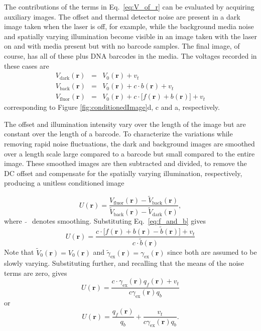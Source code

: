 The contributions of the terms in Eq.~\ref{eq:V_of_r} can be evaluated by acquiring auxiliary images. The offset and thermal detector noise are present in a dark image taken when the laser is off, for example, while the background media noise and spatially varying illumination become visible in an image taken with the laser on and with media present but with no barcode samples. The final image, of course, has all of these plus DNA barcodes in the media. The voltages recorded in these cases are
\begin{eqnarray}
V_{\text{dark}}(\mathbf{r})&=&V_0(\mathbf{r})+v_t\\
V_{\text{back}}(\mathbf{r})&=&V_0(\mathbf{r})+c \cdot  b(\mathbf{r})  +v_t\\
V_{\text{fluor}}(\mathbf{r})&=&V_0(\mathbf{r})+c \cdot \big[ f(\mathbf{r}) + b(\mathbf{r})\big]  +v_t
\end{eqnarray}
corresponding to Figure \ref{fig:conditionedImage}d, c and a, respectively. 

The offset and illumination intensity vary over the length of the image but are constant over the length of a barcode. To characterize the variations while removing rapid noise fluctuations, the dark and background images are smoothed over a length scale large compared to a barcode but small compared to the entire image. These smoothed images are then subtracted and divided, to remove the DC offset and compensate for the spatially varying illumination, respectively, producing a unitless conditioned image

\begin{equation}
U(\mathbf{r})= \frac{ V_{\text{fluor}}(\mathbf{r}) - \widetilde{V}_{\text{back}}(\mathbf{r})  }{ \widetilde{V}_{\text{back}}(\mathbf{r}) - \widetilde{V}_{\text{dark}}(\mathbf{r})} ,
\end{equation}
where~$\widetilde{~~}$~denotes smoothing. Substituting Eq.~\ref{eq:f_and_b} gives
\begin{equation}
U(\mathbf{r})= \frac{ c \cdot \big[ f(\mathbf{r})  +b(\mathbf{r}) -\widetilde{b}(\mathbf{r}) \big]+ v_t  }{   c \cdot \widetilde{b}(\mathbf{r}) }
\end{equation}
Note that $\widetilde{V}_0(\mathbf{r}) = V_0(\mathbf{r})$ and $\widetilde{\gamma}_{\text{ex}}(\mathbf{r})  = \gamma_{\text{ex}}(\mathbf{r})$ since both are assumed to be slowly varying. Substituting further, and recalling that the means of the noise terms are zero, gives
\begin{equation}
U(\mathbf{r})= \frac{ c \cdot \gamma_{\text{ex}}(\mathbf{r}) q_f(\mathbf{r})  + v_t  }{ c \gamma_{\text{ex}}(\mathbf{r})  q_b }
\end{equation}
or
\begin{equation}\label{eq:realDeal}
U(\mathbf{r})= \frac{ q_f(\mathbf{r}) }{ q_b}   + \frac{ v_t }{   c \gamma_{\text{ex}}(\mathbf{r}) q_b}.
\end{equation}


